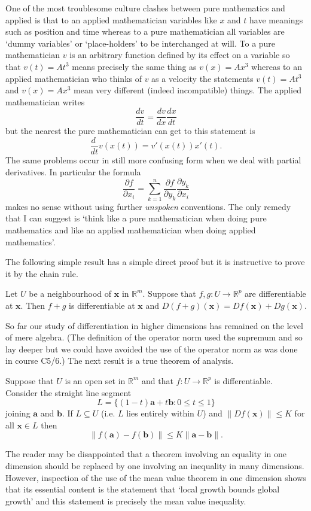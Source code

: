  One of the most troublesome
culture clashes between pure mathematics and applied
is that to an applied mathematician variables
like $x$ and $t$ have meanings such
as position and
time whereas to a pure mathematician 
all variables are `dummy variables' or `place-holders'
to be interchanged at will. To a pure mathematician
$v$ is an arbitrary function defined by its
effect on a variable so that $v(t)=At^{3}$ means
precisely the same thing as $v(x)=Ax^{3}$
whereas to an applied mathematician who thinks of
$v$ as a velocity the statements $v(t)=At^{3}$ and
$v(x)=Ax^{3}$ mean very different (indeed incompatible)
things. The applied mathematician writes
\[\frac{dv}{dt}=\frac{dv}{dx}\frac{dx}{dt}\]
but the nearest the pure mathematician can get
to this statement is
\[\frac{d\ }{dt}v(x(t))=v'(x(t))x'(t).\]
The same problems occur in still more confusing form
when we deal with partial derivatives. 
In particular the formula
\[\frac{\partial f}{\partial x_{i}}
=\sum_{k=1}^{n}\frac{\partial f}{\partial y_{k}}
\frac{\partial y_{k}}{\partial x_{i}}\]
makes no sense without using further
\emph{unspoken} conventions.
The only
remedy that I can suggest is `think like a pure mathematician
when doing pure mathematics and like an applied
mathematician when doing applied mathematics'.

The following simple result has a simple 
direct proof but
it is instructive to prove it by the chain rule.
\begin{lemma} Let $U$ be a neighbourhood
of ${\mathbf x}$ in ${\mathbb R}^{m}$.
Suppose that $f,g:U\rightarrow{\mathbb R}^{p}$
are differentiable at ${\mathbf x}$. Then
$f+g$ is differentiable at ${\mathbf x}$
and $D(f+g)({\mathbf x})=Df({\mathbf x})+Dg({\mathbf x})$. 
\end{lemma}

So far our study of differentiation in higher dimensions
has remained on the level of mere algebra. (The definition
of the operator norm used the supremum and so lay
deeper but we could have avoided the use of the
operator norm as was done in course C5/6.) The
next result is a true theorem of analysis.
\begin{theorem} Suppose that
$U$ is an open set in ${\mathbb R}^{m}$ and that
$f:U\rightarrow{\mathbb R}^{p}$ is differentiable.
Consider the straight line segment 
\[L=\{(1-t){\mathbf a}+t{\mathbf b}:0\leq t\leq 1\}\]
joining ${\mathbf a}$ and ${\mathbf b}$. If $L\subseteq U$
(i.e. $L$ lies entirely within $U$) and
$\|Df({\mathbf x})\|\leq K$ for all 
${\mathbf x}\in L$ then
\[\|f({\mathbf a})-f({\mathbf b})\|
\leq K\|{\mathbf a}-{\mathbf b}\|.\]
\end{theorem}
The reader may be disappointed that a theorem involving
an equality in one dimension should be replaced by
one involving an inequality in many dimensions.
However, inspection of the use of the mean value
theorem in one dimension shows that its essential content
is the statement that `local growth bounds global
growth' and this statement is precisely the
mean value inequality. 

